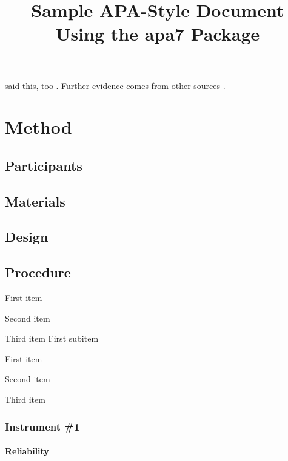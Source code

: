 \documentclass[stu]{apa7}
\title{Sample APA-Style Document Using the \textsf{apa7} Package}
\begin{document}
\maketitle
\lipsum[2]

\Textcite{vonDavier2011} said this,
too \parencite{vonDavier2011,Lassen2006}.  Further evidence comes from
other sources \parencite{Shotton1989,Lassen2006}.  \lipsum[3]

\section{Method}
\subsection{Participants}
\lipsum[4]

\subsection{Materials}
\lipsum[5]

\subsection{Design}
\lipsum[6]

\subsection{Procedure}
\lipsum[7]

\begin{APAitemize}  
  \item First item
  \item Second item
  \item Third item
  \subitem First subitem
  \begin{APAitemize}  
    \item First item
    \item Second item
    \item Third item
  \end{APAitemize}
\end{APAitemize}
  
\subsubsection{Instrument \#1}
\lipsum[8]

\paragraph{Reliability}
\lipsum[9]
\end{document}
